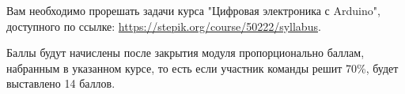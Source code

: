 
Вам необходимо прорешать задачи курса "Цифровая электроника с Arduino"{}, доступного по ссылке: \url{https://stepik.org/course/50222/syllabus}.

\markSection

Баллы будут начислены после закрытия модуля пропорционально баллам, набранным в указанном курсе, то есть если участник команды решит 70\%, будет выставлено 14 баллов. 
